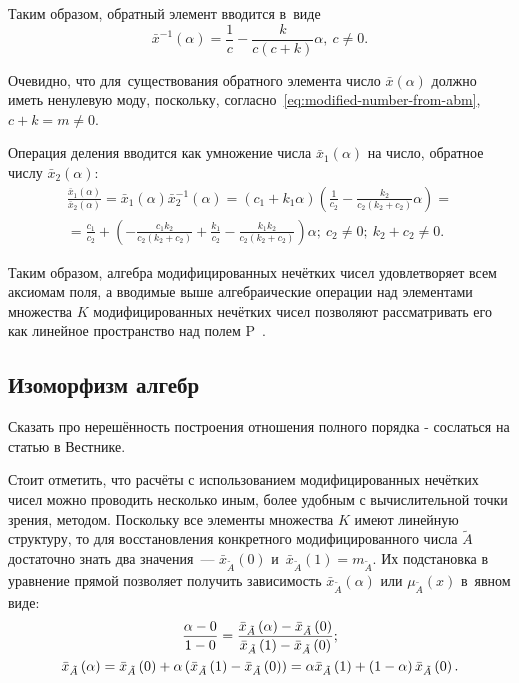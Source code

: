 Таким образом, обратный элемент вводится в~виде
\begin{equation}
\label{eq:modified-inverse-division}
  \bar{x}^{-1}(\alpha )=\frac{1}{c}-\frac{k}{c\left(c+k\right)}\alpha,\ c\ne 0.
\end{equation}

Очевидно, что для~существования обратного элемента число $\bar{x}\left( \alpha  \right)$ должно иметь ненулевую моду, поскольку, согласно~\eqref{eq:modified-number-from-abm}, $c+k=m\ne 0$.

Операция деления вводится как умножение числа $\bar{x}_1\left( \alpha  \right)$ на число, обратное числу $\bar{x}_2\left( \alpha  \right)$:
\begin{gather*}
  \frac{\bar{x}_1\left( \alpha \right)}{\bar{x}_2\left( \alpha  \right)}=\bar{x}_1\left( \alpha  \right)\bar{x}_{2}^{-1}\left( \alpha \right)=\left( c_1+k_1\alpha  \right)\left( \frac{1}{c_2}-\frac{k_2}{c_2\left( k_2+c_2 \right)}\alpha \right)={} \\ 
  {}=\frac{c_1}{c_2}+\left( -\frac{c_1k_2}{c_2\left( k_2+c_2 \right)}+\frac{k_1}{c_2}-\frac{k_1k_2}{c_2\left( k_2+c_2 \right)} \right)\alpha;\ c_2\ne 0;\ k_2+c_2\ne 0.
\end{gather*}

Таким образом, алгебра модифицированных нечётких чисел удовлетворяет всем аксиомам поля, а вводимые выше алгебраические операции над элементами множества $K$ модифицированных нечётких чисел позволяют рассматривать его как линейное пространство над полем P~\cite{Voevodin}.

\subsection{Изоморфизм алгебр}

Сказать про нерешённость построения отношения полного порядка - сослаться на статью в Вестнике.

Стоит отметить, что расчёты с использованием модифицированных нечётких чисел можно проводить несколько иным, более удобным с вычислительной точки зрения, методом. Поскольку все элементы множества $K$ имеют линейную структуру, то для восстановления конкретного модифицированного числа $\tilde{A}$ достаточно знать два значения~--- $\bar{x}_{\tilde A}\left( 0 \right)$ и~$\bar{x}_{\tilde A}\left( 1 \right)=m_{\tilde A}$. Их подстановка в уравнение прямой позволяет получить зависимость $\bar{x}_{\tilde A}\left( \alpha \right)$ или $\mu_{\tilde A}\left( x \right)$ в~явном виде:
\begin{gather}
  \frac{\alpha-0}{1-0}=\frac{\bar{x}_{\tilde A}\left( \alpha  \right)-\bar{x}_{\tilde A}\left( 0 \right)}{\bar{x}_{\tilde A}\left( 1 \right)-\bar{x}_{\tilde A}\left( 0 \right)}; \notag \\
  \label{eq:isomorphic-field}
  \bar{x}_{\tilde A}\left( \alpha \right)=\bar{x}_{\tilde A}\left( 0 \right)+\alpha \left(\bar{x}_{\tilde A}\left( 1 \right)-\bar{x}_{\tilde A}\left(0 \right) \right)=\alpha \bar{x}_{\tilde A}\left( 1 \right)+\left( 1-\alpha  \right) \bar{x}_{\tilde A}\left( 0 \right).
\end{gather}

